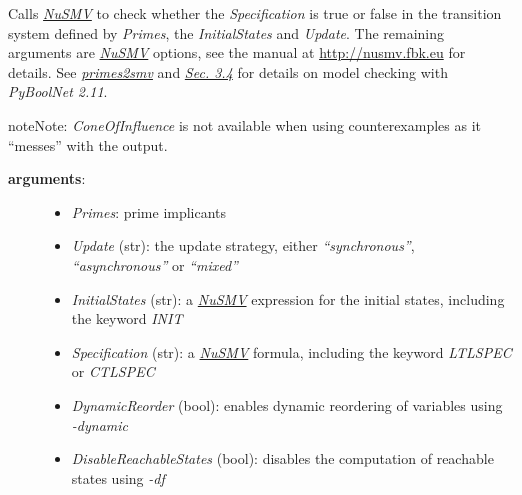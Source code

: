 \documentclass[letterpaper,10pt,english]{sphinxmanual}
\begin{document}
\begin{fulllineitems}
\label{ModelChecking:PyBoolNet.ModelChecking.check_primes_with_counterexample}
Calls {\hyperref[Installation:installation-nusmv]{\emph{NuSMV}}} to check whether the \emph{Specification} is true or false in the transition system defined by \emph{Primes},
the \emph{InitialStates} and \emph{Update}.
The remaining arguments are {\hyperref[Installation:installation-nusmv]{\emph{NuSMV}}} options, see the manual at \href{http://nusmv.fbk.eu}{http://nusmv.fbk.eu} for details.
See {\hyperref[ModelChecking:primes2smv]{\emph{primes2smv}}} and {\hyperref[Manual:sec-model-checking]{\emph{Sec. 3.4}}} for details on model checking with \emph{PyBoolNet 2.11}.

\begin{notice}{note}{Note:}
\emph{ConeOfInfluence} is not available when using counterexamples as it ``messes'' with the output.
\end{notice}
\begin{description}
\item[{\textbf{arguments}:}] \leavevmode\begin{itemize}
\item {} 
\emph{Primes}: prime implicants

\item {} 
\emph{Update} (str): the update strategy, either \emph{``synchronous''}, \emph{``asynchronous''} or \emph{``mixed''}

\item {} 
\emph{InitialStates} (str): a {\hyperref[Installation:installation-nusmv]{\emph{NuSMV}}} expression for the initial states, including the keyword \emph{INIT}

\item {} 
\emph{Specification} (str): a {\hyperref[Installation:installation-nusmv]{\emph{NuSMV}}} formula, including the keyword \emph{LTLSPEC} or \emph{CTLSPEC}

\item {} 
\emph{DynamicReorder} (bool): enables dynamic reordering of variables using \emph{-dynamic}

\item {} 
\emph{DisableReachableStates} (bool): disables the computation of reachable states using \emph{-df}

\end{itemize}


\end{description}
\end{fulllineitems}
\end{document}
